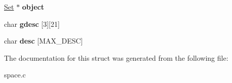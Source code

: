 \begin{DoxyCompactItemize}
\item 
\mbox{\label{struct__Space_af55fb96d4a4fc2028959c409c8fadaf0}} 
\hyperlink{struct__Set}{Set} $\ast$ {\bfseries object}
\item 
\mbox{\label{struct__Space_a0a71c4c0a4a1698f7d860ba5b80beb7f}} 
char {\bfseries gdesc} \mbox{[}3\mbox{]}\mbox{[}21\mbox{]}
\item 
\mbox{\label{struct__Space_abae14c20d773aae1b3c22c2f0346aa7a}} 
char {\bfseries desc} \mbox{[}M\+A\+X\+\_\+\+D\+E\+SC\mbox{]}
\end{DoxyCompactItemize}


The documentation for this struct was generated from the following file\+:\begin{DoxyCompactItemize}
\item 
space.\+c\end{DoxyCompactItemize}
